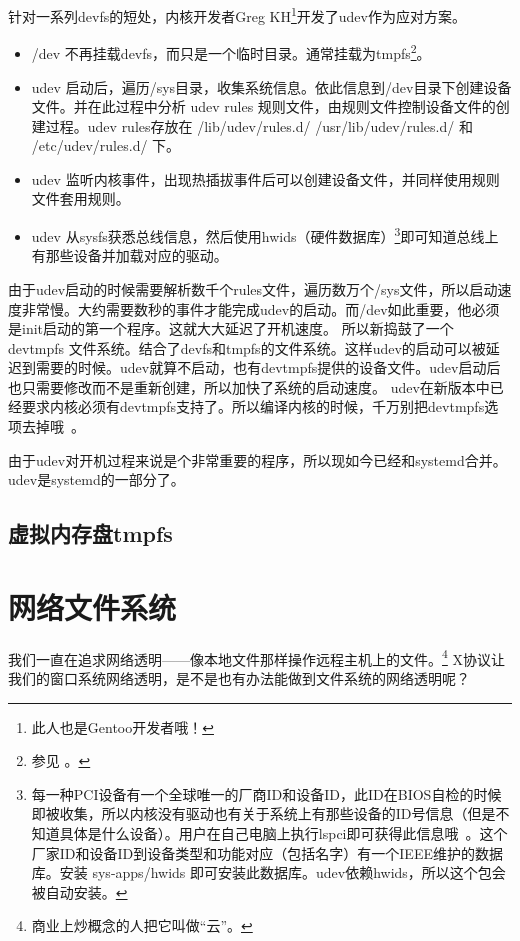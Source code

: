 针对一系列devfs的短处，内核开发者Greg KH\footnote{此人也是Gentoo开发者哦！}开发了udev作为应对方案。

\begin{itemize}
\item /dev 不再挂载devfs，而只是一个临时目录。通常挂载为tmpfs\footnote{参见 。}。
\item udev 启动后，遍历/sys目录，收集系统信息。依此信息到/dev目录下创建设备文件。并在此过程中分析 udev rules 规则文件，由规则文件控制设备文件的创建过程。udev rules存放在 /lib/udev/rules.d/ /usr/lib/udev/rules.d/ 和 /etc/udev/rules.d/ 下。
\item udev 监听内核事件，出现热插拔事件后可以创建设备文件，并同样使用规则文件套用规则。
\item udev 从sysfs获悉总线信息，然后使用hwids（硬件数据库）\footnote{每一种PCI设备有一个全球唯一的厂商ID和设备ID，此ID在BIOS自检的时候即被收集，所以内核没有驱动也有关于系统上有那些设备的ID号信息（但是不知道具体是什么设备）。用户在自己电脑上执行lspci即可获得此信息哦~。这个厂家ID和设备ID到设备类型和功能对应（包括名字）有一个IEEE维护的数据库。安装 sys-apps/hwids 即可安装此数据库。udev依赖hwids，所以这个包会被自动安装。}即可知道总线上有那些设备并加载对应的驱动。
\end{itemize}

由于udev启动的时候需要解析数千个rules文件，遍历数万个/sys文件，所以启动速度非常慢。大约需要数秒的事件才能完成udev的启动。而/dev如此重要，他必须是init启动的第一个程序。这就大大延迟了开机速度。
所以新捣鼓了一个 devtmpfs 文件系统。结合了devfs和tmpfs的文件系统。这样udev的启动可以被延迟到需要的时候。udev就算不启动，也有devtmpfs提供的设备文件。udev启动后也只需要修改而不是重新创建，所以加快了系统的启动速度。
udev在新版本中已经要求内核必须有devtmpfs支持了。所以编译内核的时候，千万别把devtmpfs选项去掉哦~。

由于udev对开机过程来说是个非常重要的程序，所以现如今已经和systemd合并。udev是systemd的一部分了。

\subsection{虚拟内存盘tmpfs}\label{sec:tmpfs}

\section{网络文件系统}

我们一直在追求网络透明——像本地文件那样操作远程主机上的文件。\footnote{商业上炒概念的人把它叫做“云”。}
X协议让我们的窗口系统网络透明，是不是也有办法能做到文件系统的网络透明呢？


